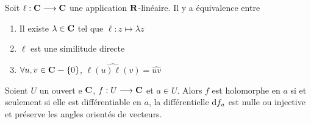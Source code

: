 \begin{rem}
Soit $ \ell:\mathbf C\longrightarrow \mathbf C$ une application $\mathbf R$-linéaire. Il y a équivalence entre \begin{enumerate}
    \item Il existe $ \lambda \in  \mathbf C$ tel que $\ell:z\longmapsto \lambda z$
    \item $\ell$ est une similitude directe
    \item $\forall  u,v \in  \mathbf C\bm-  \left\{ 0 \right\} $, $\hat{\ell(u)\ell(v)}=\hat{uv}$
\end{enumerate}
\end{rem}

\begin{prop}
    Soient $U$ un ouvert  e $ \mathbf C$, $f:U\longrightarrow \mathbf C$ et $a \in  U$. Alors $f$ est holomorphe en $a$ si et seulement si elle est différentiable en $a$, la différentielle $\mathop{}\!\mathrm d f_a$ est nulle ou injective et préserve les angles orientés de vecteurs.
\end{prop}


